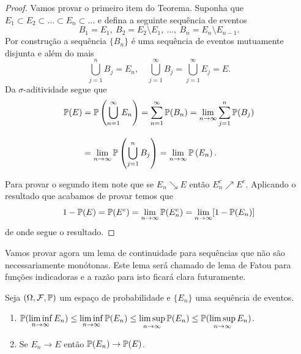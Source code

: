 \begin{proof}
Vamos provar o primeiro item do Teorema. 
Suponha que $E_1\subset E_2\subset \ldots\subset E_n\subset \ldots$
e defina a seguinte sequência de eventos 
\[
B_1= E_1,\ B_2= E_2\setminus E_1,\ \ldots,\  B_n=E_n\setminus E_{n-1}.
\]
Por construção a sequência $\{B_n\}$ é uma sequência de eventos
mutuamente disjunta e além do mais 
\[
\bigcup_{j=1}^n B_j = E_n, \quad 
\bigcup_{j=1}^{\infty} B_j = \bigcup_{j=1}^{\infty} E_j = E.
\]
Da $\sigma$-aditividade segue que 
\begin{align*}
	\P(E)
	&=
		\P\left( \bigcup_{n=1}^{\infty} E_n\right)
		=
		\sum_{n=1}^{\infty}\P(B_n)
		=
		\lim_{n\to\infty} \sum_{j=1}^n \P(B_j)
	\\[0.3cm]
	&=
		\lim_{n\to\infty}\P\left( \bigcup_{j=1}^{n} B_j\right)
		=
		\lim_{n\to\infty}\P\left( E_n\right).
\end{align*}

Para provar o segundo item note que se $E_n\searrow E$ 
então $E_n^c \nearrow E^c$. Aplicando o resultado que 
acabamos de provar temos que 
	\[
		1-\P(E)
		=
		\P(E^c)		
		=
		\lim_{n\to\infty} \P(E_n^c)
		=
		\lim_{n\to\infty} [1-\P(E_n)]		
	\]
de onde segue o resultado.
\end{proof}

Vamos provar agora um lema de continuidade para sequências 
que não são necessariamente monótonas. 
Este lema será chamado de lema de Fatou para funções indicadoras
e a razão para isto ficará clara futuramente.

\begin{lema}
\label{lema-fatou-indicadoras}
Seja $(\Omega,\F,\P)$ um espaço de probabilidade e 
$\{E_n\}$ uma sequência de eventos.
\begin{enumerate}
	\item
	$\displaystyle
	\P(\liminf_{n\to\infty} E_n)
	\leq 
	\liminf_{n\to\infty} \P(E_n)
	\leq
	\limsup_{n\to\infty} \P(E_n)
	\leq
	\P(\limsup_{n\to\infty} E_n)$.
	
	\item Se $E_n\to E$ então $\P(E_n)\to \P(E)$.
\end{enumerate}
\end{lema}


